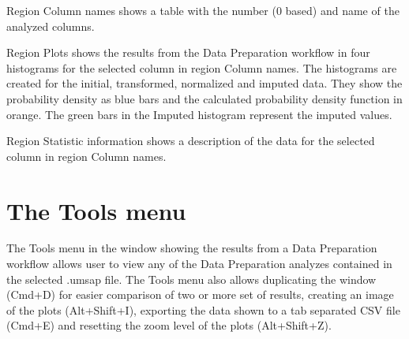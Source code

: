 Region Column names shows a table with the number (\num{0} based) and name of the
analyzed columns. 

Region Plots shows the results from the Data Preparation workflow in four histograms
for the selected column in region Column names. The histograms are created for the
initial, transformed, normalized and imputed data. They show the probability density
as blue bars and the calculated probability density function in orange. The green bars
in the Imputed histogram represent the imputed values.

Region Statistic information shows a description of the data for the selected column
in region Column names.

\section{The Tools menu}

The Tools menu in the window showing the results from a Data Preparation workflow
allows user to view any of the Data Preparation analyzes contained in the selected
.umsap file. The Tools menu also allows duplicating the window (Cmd+D) for easier
comparison of two or more set of results, creating an image of the plots (Alt+Shift+I),
exporting the data shown to a tab separated CSV file (Cmd+E) and resetting the zoom
level of the plots (Alt+Shift+Z).